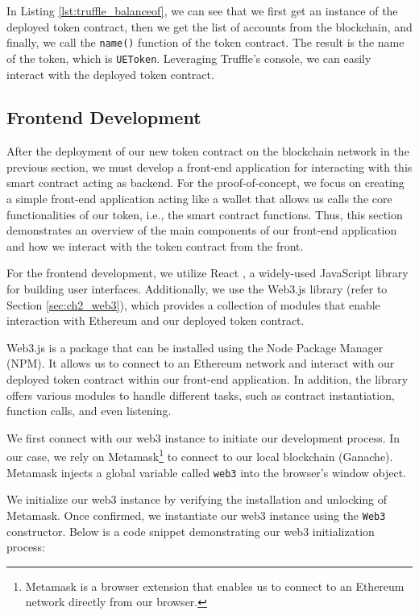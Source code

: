 In Listing \ref{lst:truffle_balanceof}, we can see that we first get an instance of the deployed token contract, then we get the list of accounts
from the blockchain, and finally, we call the \texttt{name()} function of the token contract. The result is the name of the token, which is \texttt{UEToken}. Leveraging Truffle's console, we can easily interact with the deployed token contract.


\subsection{Frontend Development}
\label{subsec:wallet_frontend}

After the deployment of our new token contract on the blockchain network in the previous section, we must develop a front-end application for interacting with this smart contract
acting as backend.
For the proof-of-concept, we focus on creating a simple front-end application acting like a wallet that allows us calls the core functionalities of our token, i.e., the smart contract functions.
Thus, this section demonstrates an overview of the main components of our front-end application and how we interact with the token contract from the front.

For the frontend development, we utilize React \cite{react}, a widely-used JavaScript library for building user interfaces. Additionally, we use the Web3.js \cite{eth_web3js}
library (refer to Section \ref{sec:ch2_web3}), which provides a collection of modules that enable interaction with Ethereum and our deployed token contract.

Web3.js is a package that can be installed using the Node Package Manager (NPM). It allows us to connect to an Ethereum network and interact with our deployed token contract within our front-end application. In addition, the library offers various modules to handle different tasks, such as contract instantiation, function calls,
and even listening.

We first connect with our web3 instance to initiate our development process. In our case, we rely on Metamask\footnote{Metamask is a browser extension that enables us to connect to an Ethereum network directly from our browser.} to 
connect to our local blockchain (Ganache). Metamask injects a global variable called \texttt{web3} into the browser's window object.

We initialize our web3 instance by verifying the installation and unlocking of Metamask. Once confirmed, we instantiate our web3 instance using the \texttt{Web3} constructor. Below is a code snippet demonstrating our web3 initialization process:

